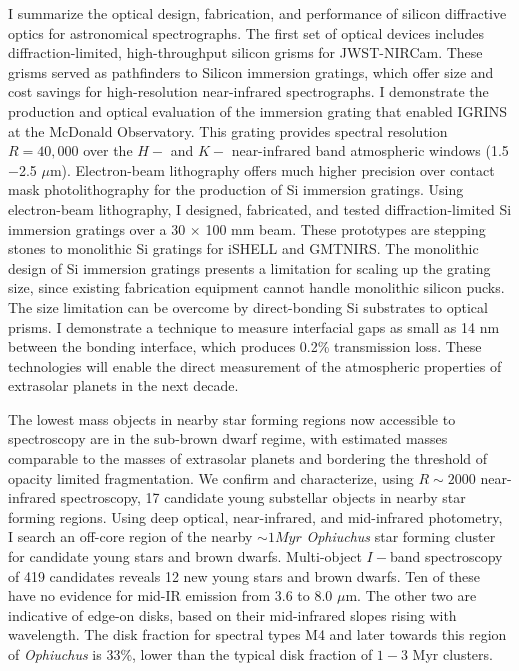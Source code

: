 \documentclass[12pt]{report}	%
\begin{document}
%
\utabstract
{}%
\indent

I summarize the optical design, fabrication, and performance of silicon diffractive optics for astronomical spectrographs.  The first set of optical devices includes diffraction-limited, high-throughput silicon grisms for JWST-NIRCam.  These grisms served as pathfinders to Silicon immersion gratings, which offer size and cost savings for high-resolution near-infrared spectrographs.  I demonstrate the production and optical evaluation of the immersion grating that enabled IGRINS at the McDonald Observatory.  This grating provides spectral resolution $R=40,000$ over the $H-$ and $K-$ near-infrared band atmospheric windows (1.5$-$2.5 $\mu$m).  Electron-beam lithography offers much higher precision over contact mask photolithography for the production of Si immersion gratings.  Using electron-beam lithography, I designed, fabricated, and tested diffraction-limited Si immersion gratings over a 30 $\times$ 100 mm beam.  These prototypes are stepping stones to monolithic Si gratings for iSHELL and GMTNIRS.  The monolithic design of Si immersion gratings presents a limitation for scaling up the grating size, since existing fabrication equipment cannot handle monolithic silicon pucks.  The size limitation can be overcome by direct-bonding Si substrates to optical prisms.  I demonstrate a technique to measure interfacial gaps as small as 14 nm between the bonding interface, which produces 0.2\% transmission loss.  These technologies will enable the direct measurement of the atmospheric properties of extrasolar planets in the next decade.  

The lowest mass objects in nearby star forming regions now accessible to spectroscopy are in the sub-brown dwarf regime, with estimated masses comparable to the masses of extrasolar planets and bordering the threshold of opacity limited fragmentation.  We confirm and characterize, using $R\sim 2000$ near-infrared spectroscopy, 17 candidate young substellar objects in nearby star forming regions.  Using deep optical, near-infrared, and mid-infrared photometry, I search an off-core region of the nearby $\sim1 Myr$ \emph{Ophiuchus} star forming cluster for candidate young stars and brown dwarfs.  Multi-object $I-$band spectroscopy of 419 candidates reveals 12 new young stars and brown dwarfs.  Ten of these have no evidence for mid-IR emission from 3.6 to 8.0 $\mu$m.  The other two are indicative of edge-on disks, based on their mid-infrared slopes rising with wavelength.  The disk fraction for spectral types M4 and later towards this region of \emph{Ophiuchus} is 33\%, lower than the typical disk fraction of $1-3$ Myr clusters.
\end{document}
